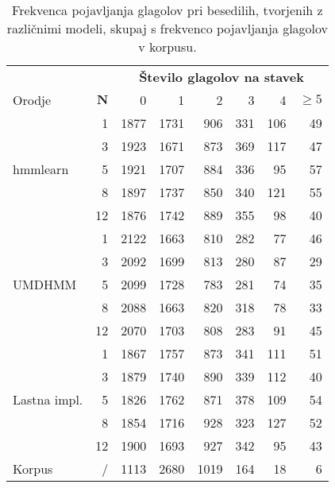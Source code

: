 \begin{table}
\begin{minipage}{\textwidth}
\centering
\begin{tabular}{l r rrrrrr}
  \toprule
    &  & \multicolumn{6}{c}{\bf Število glagolov na stavek} \\
  Orodje &  $\mathbf{N}$ & 0 & 1 & 2 & 3 & 4 & {\bf} $\geq 5$ \\
  \midrule\multirow{5}{*}{hmmlearn} %
         &    1     & 1877 &  1731 &  906 & 331 & 106 & 49 \\
         &    3     & 1923 &  1671 &  873 & 369 & 117 & 47 \\
         &    5     & 1921 &  1707 &  884 & 336 &  95 & 57 \\
         &    8     & 1897 &  1737 &  850 & 340 & 121 & 55 \\
         &   12     & 1876 &  1742 &  889 & 355 &  98 & 40 \\
  \midrule\multirow{5}{*}{UMDHMM} %
         &    1     & 2122 &  1663 &  810 & 282 &  77 & 46 \\
         &    3     & 2092 &  1699 &  813 & 280 &  87 & 29 \\
         &    5     & 2099 &  1728 &  783 & 281 &  74 & 35 \\
         &    8     & 2088 &  1663 &  820 & 318 &  78 & 33 \\
         &   12     & 2070 &  1703 &  808 & 283 &  91 & 45 \\
  \midrule\multirow{5}{*}{Lastna impl.} %
         &    1     & 1867 &  1757 &  873 & 341 & 111 & 51 \\
         &    3     & 1879 &  1740 &  890 & 339 & 112 & 40 \\
         &    5     & 1826 &  1762 &  871 & 378 & 109 & 54 \\
         &    8     & 1854 &  1716 &  928 & 323 & 127 & 52 \\
         &   12     & 1900 &  1693 &  927 & 342 &  95 & 43 \\
  \midrule
  Korpus &    /     & 1113 &  2680 & 1019 & 164 &  18 &  6 \\
  \bottomrule
\end{tabular} \\
  \vspace{6pt}{\centering N \dots število skritih stanj modela}
\caption{Frekvenca pojavljanja glagolov pri besedilih, tvorjenih z različnimi
  modeli, skupaj s frekvenco pojavljanja glagolov v korpusu.}
\label{tab:bench:measurements}
\end{minipage}
\end{table}
